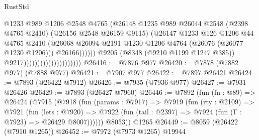 \begin{lexlean}{RustStd}
\begin{coremodule}
                                                      @1233
                                                      @989
                                                      @1206
                                                      @2548
                                                      @4765
                                                      (@26148
                                                        @1235
                                                        @989
                                                        @26044
                                                        @2548
                                                        (@2398 @4765 @2410)
                                                        (@26156 @2548 @26159 @9115)
                                                        (@26147
                                                          @1233
                                                          @126
                                                          @1206
                                                          @44
                                                          @4765
                                                          @2410
                                                          (@26068
                                                            @26094
                                                            @2191
                                                            @1230
                                                            @1206
                                                            @4764
                                                            (@26076 (@26077 @1230 @1206)))
                                                          @26166))))))
                                              @9205
                                              (@8348 (@9210 @1199 @1247 @385))
                                              @9217)))))))))))))))))))))
@26416 := @7876 @977
@26420 := @7878 (@7882 @977) (@7888 @977)
@26421 := @7907 @977
@26422 := @7897 @26421
@26424 := @7893 (@26422 @7912)
@26426 := @7935 (@7936 @977)
@26427 := @7931 @26426
@26429 := @7893 (@26427 @7960)
@26446 := @7892
    (fun (fn : @89) =>
    @26424
      (@7915
        (@7918
          (fun (params : @7917) =>
          @7919
            (fun (rty : @2109) =>
            @7921
              (fun (lets : @7920) =>
              @7922 (fun (tail : @2397) => @7924 (fun (Γ : @7923) => @26429 @8007))))))
        @8053))
    @1265
@26449 := @8059 (@26422 (@7910 @1265))
@26452 := @7972 (@7973 @1265) @19944

\end{coremodule}
\end{lexlean}
